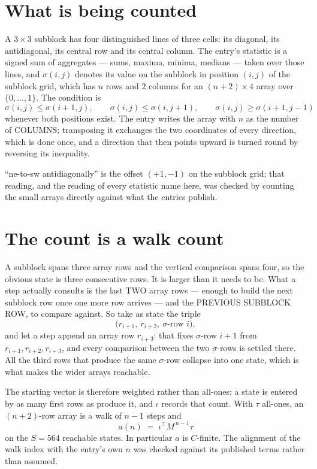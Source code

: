 \documentclass[11pt,a4paper]{article}
\theoremstyle{plain}
\theoremstyle{definition}
\begin{document}
\section{What is being counted}

A $3\times3$ subblock has four distinguished lines of three cells: its diagonal, its
antidiagonal, its central row and its central column. The entry's statistic is a signed sum of
aggregates --- sums, maxima, minima, medians --- taken over those lines, and $\sigma(i,j)$
denotes its value on the subblock in position $(i,j)$ of the subblock grid, which has $n$ rows
and $2$ columns for an $(n+2)\times4$ array over $\{0,\dots,1\}$. The condition is
\[
\sigma(i,j)\le\sigma(i+1,j),\qquad \sigma(i,j)\le\sigma(i,j+1),\qquad \sigma(i,j)\ge\sigma(i+1,j-1)
\]
whenever both positions exist. The entry writes the array with $n$ as the number of COLUMNS; transposing it exchanges the two coordinates of every direction, which is done once, and a direction that then points upward is turned round by reversing its inequality.

``ne-to-sw antidiagonally'' is the offset $(+1,-1)$ on the subblock grid; that reading, and
the reading of every statistic name here, was checked by counting the small arrays directly
against what the entries publish.

\section{The count is a walk count}

A subblock spans three array rows and the vertical comparison spans four, so the obvious state
is three consecutive rows. It is larger than it needs to be. What a step actually consults is
the last TWO array rows --- enough to build the next subblock row once one more row arrives ---
and the PREVIOUS SUBBLOCK ROW, to compare against. So take as state the triple
\[
\bigl(r_{i+1},\ r_{i+2},\ \sigma\text{-row }i\bigr),
\]
and let a step append an array row $r_{i+3}$: that fixes $\sigma$-row $i+1$ from
$r_{i+1},r_{i+2},r_{i+3}$, and every comparison between the two $\sigma$-rows is settled
there. All the third rows that produce the same $\sigma$-row collapse into one state, which is
what makes the wider arrays reachable.

The starting vector is therefore weighted rather than all-ones: a state is entered by as many
first rows as produce it, and $\iota$ records that count. With $\tau$ all-ones, an
$(n+2)$-row array is a walk of $n-1$ steps and
\[
a(n)\;=\;\iota^{\!\top}M^{\,n-1}\tau
\]
on the $S=564$ reachable states. In particular $a$ is $C$-finite. The alignment of the walk
index with the entry's own $n$ was checked against its published terms rather than assumed.
\end{document}
